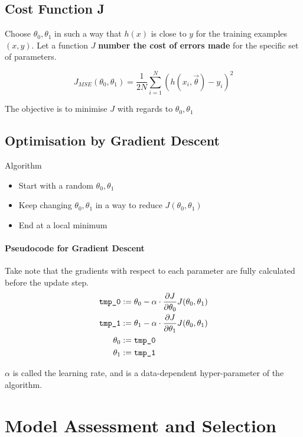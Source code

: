 \documentclass[11pt]{article}
\theoremstyle{definition}
\begin{document}
\subsection{Cost Function J}
Choose $\theta_0, \theta_1$ in such a way that $h(x)$ is close to $y$ for the training examples $(x,y)$. Let a function $J$ \textbf{number the cost of errors made} for the specific set of parameters.

\begin{equation*}
	J_{MSE}(\theta_0, \theta_1) = \frac{1}{2N} \sum_{i=1}^{N} \left(h(x_i, \vec{\theta}) - y_i\right)^2
\end{equation*}

The objective is to minimise $J$ with regards to $\theta_0, \theta_1$

\subsection{Optimisation by Gradient Descent}
Algorithm
\begin{itemize}
	\item Start with a random $\theta_0, \theta_1$
	\item Keep changing $\theta_0, \theta_1$ in a way to reduce $J(\theta_0, \theta_1)$
	\item End at a local minimum
\end{itemize}

\paragraph{Pseudocode for Gradient Descent} Take note that the gradients with respect to each parameter are fully calculated before the update step.
\begin{align*}
	\text{\texttt{tmp\_0}} &:= \theta_0 - \alpha \cdot \frac{\partial J}{\partial \theta_0} J(\theta_0,\theta_1)\\
	\text{\texttt{tmp\_1}} &:= \theta_1 - \alpha \cdot \frac{\partial J}{\partial \theta_1} J(\theta_0,\theta_1)\\
	\theta_0 &:= \text{\texttt{tmp\_0}}\\
	\theta_1 &:= \text{\texttt{tmp\_1}}\\
\end{align*}

$\alpha$ is called the learning rate, and is a data-dependent hyper-parameter of the algorithm.

\section{Model Assessment and Selection}
\end{document}
